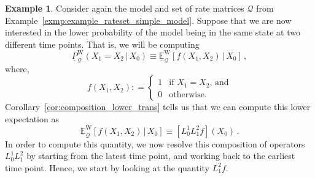 \documentclass[10pt,a4paper]{paper}
\theoremstyle{definition}
\newtheorem{exmp}{Example}%
\newcommand{\rateset}{\mathcal{Q}}
\newcommand{\coloneqq}{:\!=}
\begin{document}
\begin{exmp}\label{exmp:num_multivar_func_nonmarkov}
Consider again the model and set of rate matrices $\rateset$ from Example~\ref{exmp:example_rateset_simple_model}. Suppose that we are now interested in the lower probability of the model being in the same state at two different time points. That is, we will be computing
\begin{equation*}
\underline{P}_{\rateset}^{\mathrm{W}}(X_1 = X_2\,\vert\, X_0) \equiv \underline{\mathbb{E}}_{\rateset}^{\mathrm{W}}[f(X_1,X_2)\,\vert\,X_0]\,,
\end{equation*}
where,
\begin{equation*}
f(X_1,X_2) \coloneqq \left\{\begin{array}{ll}
1 & \text{if $X_1 = X_2$, and} \\
0 & \text{otherwise.}
\end{array}\right.
\end{equation*}
Corollary~\ref{cor:composition_lower_trans} tells us that we can compute this lower expectation as
\begin{equation}\label{eq:num_example_composition}
\underline{\mathbb{E}}_{\rateset}^\mathrm{W}[f(X_1,X_2)\,\vert\,X_0] \equiv \left[L_0^1L_1^2f\right](X_0)\,.
\end{equation}
In order to compute this quantity, we now resolve this composition of operators $L_0^1L_1^2$ by starting from the latest time point, and working back to the earliest time point. Hence, we start by looking at the quantity $L_1^2f$. 


\end{exmp}
\end{document}
